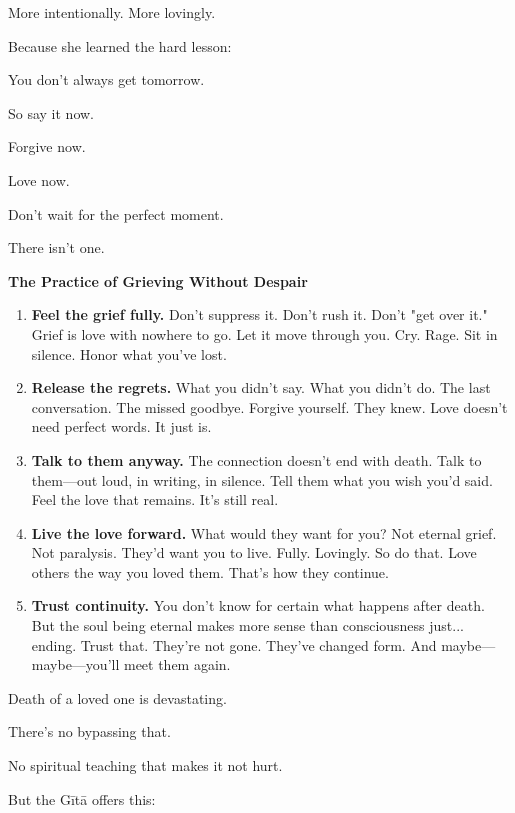 \documentclass[11pt,twoside]{book}
\begin{document}
More intentionally. More lovingly.

Because she learned the hard lesson:

You don't always get tomorrow.

So say it now.

Forgive now.

Love now.

Don't wait for the perfect moment.

There isn't one.

\begin{practicebox}
\textbf{The Practice of Grieving Without Despair}

\begin{enumerate}
\item \textbf{Feel the grief fully.} Don't suppress it. Don't rush it. Don't "get over it." Grief is love with nowhere to go. Let it move through you. Cry. Rage. Sit in silence. Honor what you've lost.

\item \textbf{Release the regrets.} What you didn't say. What you didn't do. The last conversation. The missed goodbye. Forgive yourself. They knew. Love doesn't need perfect words. It just is.

\item \textbf{Talk to them anyway.} The connection doesn't end with death. Talk to them—out loud, in writing, in silence. Tell them what you wish you'd said. Feel the love that remains. It's still real.

\item \textbf{Live the love forward.} What would they want for you? Not eternal grief. Not paralysis. They'd want you to live. Fully. Lovingly. So do that. Love others the way you loved them. That's how they continue.

\item \textbf{Trust continuity.} You don't know for certain what happens after death. But the soul being eternal makes more sense than consciousness just... ending. Trust that. They're not gone. They've changed form. And maybe—maybe—you'll meet them again.
\end{enumerate}
\end{practicebox}

Death of a loved one is devastating.

There's no bypassing that.

No spiritual teaching that makes it not hurt.

But the Gītā offers this:
\end{document}
